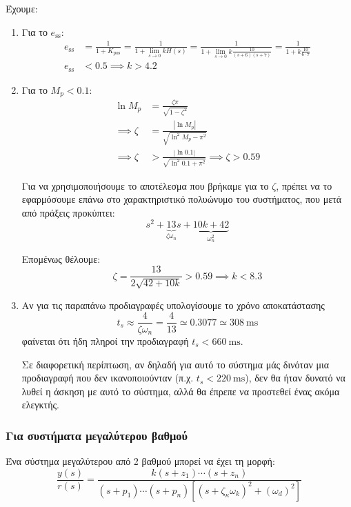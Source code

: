 \documentclass[11pt,a4paper,notitlepage,fleqn,draft]{article}
\begin{document}
Έχουμε:
\begin{enumerate}
	\item Για το \( e_{\mathrm{ss}} \):
	\begin{align*}
		e_{\mathrm{ss}} &= \frac{1}{1+K_{\mathrm{pos}}}
		= \frac{1}{1+\lim_{s\to 0}kH(s)}
		= \frac{1}{1+\lim_{s\to 0}k\frac{10}{(s+6)(s+7)}}
		= \frac{1}{1+k\frac{10}{6\cdot 7}} \\
		e_{\mathrm{ss}} &< 0.5 \implies \boxed{k > 4.2}
	\end{align*}
	\item Για το \( M_p < 0.1 \):
	\begin{align*}
		\ln M_p &= \frac{ζπ}{\sqrt{1-ζ^2}}\\
		\implies ζ &= \frac{\left\lvert \ln M_p \right\rvert}{
			\sqrt{\ln^2 M_p - π^2}
			}\\
		\implies ζ &> \frac{|\ln 0.1 |}{\sqrt{\ln^2 0.1 + π^2}}
		\implies \boxed{ζ > 0.59}
	\end{align*}
	
	Για να χρησιμοποιήσουμε το αποτέλεσμα που βρήκαμε για το \( ζ \), πρέπει να το
	εφαρμόσουμε επάνω στο χαρακτηριστικό πολυώνυμο του συστήματος, που μετά από πράξεις
	προκύπτει:
	\[
	s^2+
	\underbrace{13}_{ζ\omega_n}s
	+\underbrace{10k+42}_{\omega_n^2}
	\]
	
	Επομένως θέλουμε:
	\[
	ζ = \frac{13}{2\sqrt{42+10k}} > 0.59
	\implies \boxed{k < 8.3}
	\]
	
	\item
	Αν για τις παραπάνω προδιαγραφές υπολογίσουμε το χρόνο αποκατάστασης
	\[
	t_s \approx \frac{4}{ζ\omega_n}
	= \frac{4}{13} \simeq 0.3077 \simeq 308\ \mathrm{ms}
	\]
	φαίνεται ότι ήδη πληροί την προδιαγραφή \( t_s < 660\ \mathrm{ms} \).
	
	Σε διαφορετική περίπτωση, αν δηλαδή για αυτό το σύστημα μάς δινόταν μια προδιαγραφή
	που δεν ικανοποιούνταν (π.χ. \( t_s < 220\ \mathrm{ms} \)), δεν θα ήταν δυνατό να
	λυθεί η άσκηση με αυτό το σύστημα, αλλά θα έπρεπε να προστεθεί ένας ακόμα ελεγκτής.
\end{enumerate}

\subsubsection{Για συστήματα μεγαλύτερου βαθμού}
Ένα σύστημα μεγαλύτερου από 2 βαθμού μπορεί να έχει τη μορφή:
\[
\frac{y(s)}{r(s)}
= \frac{k(s+z_1)\cdots(s+z_n)}{(s+p_1)\cdots(s+p_n)\left[
	(s+ζ_κ\omega_k)^2+(\omega_d)^2
	\right]}
\]
\end{document}

